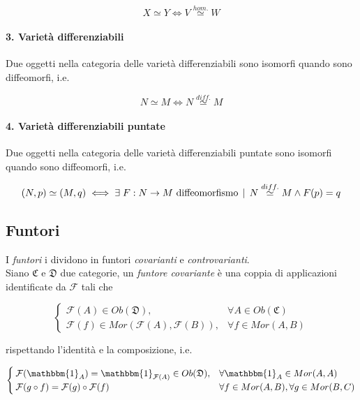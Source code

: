 \begin{equation}
	X \simeq Y \iff V \stackrel{hom.}{\simeq} W
\end{equation}

\paragraph{3. Varietà differenziabili}

Due oggetti nella categoria delle varietà differenziabili sono isomorfi quando sono diffeomorfi, i.e.

\begin{equation}
	N \simeq M \iff N \stackrel{diff.}{\simeq} M
\end{equation}

\paragraph{4. Varietà differenziabili puntate}

Due oggetti nella categoria delle varietà differenziabili puntate sono isomorfi quando sono diffeomorfi, i.e.

\begin{equation}
	(N,p) \simeq (M,q) \iff \exists \; F : N \to M \text{ diffeomorfismo} \, \mid \, N \stackrel{diff.}{\simeq} M \wedge F(p)=q
\end{equation}

\subsection{Funtori}

I \textit{funtori} i dividono in funtori \textit{covarianti} e \textit{controvarianti}.\\
Siano $ \mathfrak{C} $ e $ \mathfrak{D} $ due categorie, un \textit{funtore covariante} è una coppia di applicazioni identificate da $ \mathcal{F} $ tali che

\begin{equation}
	\begin{cases}
		\mathcal{F}(A) \in Ob(\mathfrak{D}), & \forall A \in Ob(\mathfrak{C})\\
		\mathcal{F}(f) \in Mor(\mathcal{F}(A),\mathcal{F}(B)), & \forall f \in Mor(A,B)
	\end{cases}
\end{equation}

rispettando l'identità e la composizione, i.e.

\begin{equation}
	\begin{cases}
		\mathcal{F}(\mathbbm{1}_{A}) = \mathbbm{1}_{\mathcal{F}(A)} \in Ob(\mathfrak{D}), & \forall \mathbbm{1}_{A} \in Mor(A,A)\\
		\mathcal{F}(g \circ f) = \mathcal{F}(g) \circ \mathcal{F}(f) & \forall f \in Mor(A,B), \forall g \in Mor(B,C)
	\end{cases}
\end{equation}

